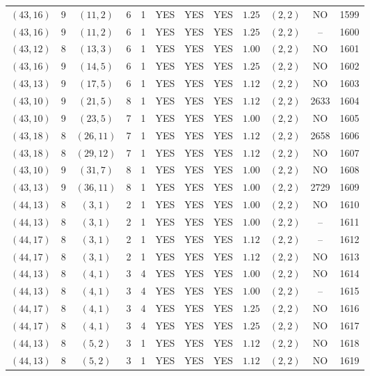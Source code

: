 \begin{longtable}{|c|c|c|c|c|c|c|c|c|c|c|c|}
$(43,16)$ & 9 & $(11,2)$ & 6 & 1 & YES & YES & YES & $1.25$ & $(2,2)$ & NO & 1599\\
$(43,16)$ & 9 & $(11,2)$ & 6 & 1 & YES & YES & YES & $1.25$ & $(2,2)$ & -- & 1600\\
$(43,12)$ & 8 & $(13,3)$ & 6 & 1 & YES & YES & YES & $1.00$ & $(2,2)$ & NO & 1601\\
$(43,16)$ & 9 & $(14,5)$ & 6 & 1 & YES & YES & YES & $1.25$ & $(2,2)$ & NO & 1602\\
$(43,13)$ & 9 & $(17,5)$ & 6 & 1 & YES & YES & YES & $1.12$ & $(2,2)$ & NO & 1603\\
$(43,10)$ & 9 & $(21,5)$ & 8 & 1 & YES & YES & YES & $1.12$ & $(2,2)$ & 2633 & 1604\\
$(43,10)$ & 9 & $(23,5)$ & 7 & 1 & YES & YES & YES & $1.00$ & $(2,2)$ & NO & 1605\\
$(43,18)$ & 8 & $(26,11)$ & 7 & 1 & YES & YES & YES & $1.12$ & $(2,2)$ & 2658 & 1606\\
$(43,18)$ & 8 & $(29,12)$ & 7 & 1 & YES & YES & YES & $1.12$ & $(2,2)$ & NO & 1607\\
$(43,10)$ & 9 & $(31,7)$ & 8 & 1 & YES & YES & YES & $1.00$ & $(2,2)$ & NO & 1608\\
$(43,13)$ & 9 & $(36,11)$ & 8 & 1 & YES & YES & YES & $1.00$ & $(2,2)$ & 2729 & 1609\\
$(44,13)$ & 8 & $(3,1)$ & 2 & 1 & YES & YES & YES & $1.00$ & $(2,2)$ & NO & 1610\\
$(44,13)$ & 8 & $(3,1)$ & 2 & 1 & YES & YES & YES & $1.00$ & $(2,2)$ & -- & 1611\\
$(44,17)$ & 8 & $(3,1)$ & 2 & 1 & YES & YES & YES & $1.12$ & $(2,2)$ & -- & 1612\\
$(44,17)$ & 8 & $(3,1)$ & 2 & 1 & YES & YES & YES & $1.12$ & $(2,2)$ & NO & 1613\\
$(44,13)$ & 8 & $(4,1)$ & 3 & 4 & YES & YES & YES & $1.00$ & $(2,2)$ & NO & 1614\\
$(44,13)$ & 8 & $(4,1)$ & 3 & 4 & YES & YES & YES & $1.00$ & $(2,2)$ & -- & 1615\\
$(44,17)$ & 8 & $(4,1)$ & 3 & 4 & YES & YES & YES & $1.25$ & $(2,2)$ & NO & 1616\\
$(44,17)$ & 8 & $(4,1)$ & 3 & 4 & YES & YES & YES & $1.25$ & $(2,2)$ & NO & 1617\\
$(44,13)$ & 8 & $(5,2)$ & 3 & 1 & YES & YES & YES & $1.12$ & $(2,2)$ & NO & 1618\\
$(44,13)$ & 8 & $(5,2)$ & 3 & 1 & YES & YES & YES & $1.12$ & $(2,2)$ & NO & 1619\\

\end{longtable}
